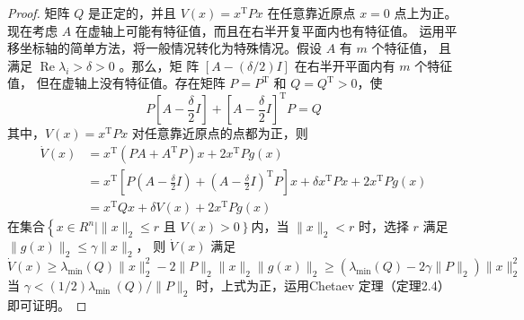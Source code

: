 \begin{proof}
    矩阵 $Q$ 是正定的，并且 $V(x)=x^{\mathrm{T}} P x$ 在任意靠近原点 $x=0$ 点上为正。
    现在考虑 $A$ 在虚轴上可能有特征值，而且在右半开复平面内也有特征值。
    运用平移坐标轴的简单方法，将一般情况转化为特殊情况。假设 $A$ 有 $m$ 个特征值，
    且满足 $\operatorname{Re} \lambda_i>\delta>0$ 。那么，矩 阵 $[A-(\delta / 2) I]$ 在右半开平面内有 $m$ 个特征值，
    但在虚轴上没有特征值。存在矩阵 $P=P^{\mathrm{T}}$ 和 $Q=Q^{\mathrm{T}}>0$，使
    \begin{equation}
        P\left[A-\frac{\delta}{2} I\right]+\left[A-\frac{\delta}{2} I\right]^{\mathrm{T}} P=Q
    \end{equation}
    其中，$V(x)=x^{\mathrm{T}} P x$ 对任意靠近原点的点都为正，则
    \begin{equation}
        \begin{aligned}
        \dot{V}(x) & =x^{\mathrm{T}}\left(P A+A^{\mathrm{T}} P\right) x+2 x^{\mathrm{T}} P g(x) \\
        & =x^{\mathrm{T}}\left[P\left(A-\frac{\delta}{2} I\right)+\left(A-\frac{\delta}{2} I\right)^{\mathrm{T}} P\right] x+\delta x^{\mathrm{T}} P x+2 x^{\mathrm{T}} P g(x) \\
        & =x^{\mathrm{T}} Q x+\delta V(x)+2 x^{\mathrm{T}} P g(x)
        \end{aligned}
    \end{equation}
    在集合$\left\{x \in R^n \mid\|x\|_2 \leqslant r\right.$ 且 $\left.V(x)>0\right\}$内，当 $\|x\|_2<r$ 时，选择 $r$ 满足 $\|g(x)\|_2 \leqslant \gamma\|x\|_2$，
    则 $\dot{V}(x)$ 满足
    \begin{equation}
        \dot{V}(x) \geqslant \lambda_{\min }(Q)\|x\|_2^2-2\|P\|_2\|x\|_2\|g(x)\|_2 \geqslant\left(\lambda_{\min }(Q)-2 \gamma\|P\|_2\right)\|x\|_2^2
    \end{equation}
    当 $\gamma<(1 / 2) \lambda_{\text {min }}(Q) /\|P\|_2$ 时，上式为正，运用Chetaev 定理（定理2.4）即可证明。
\end{proof}
